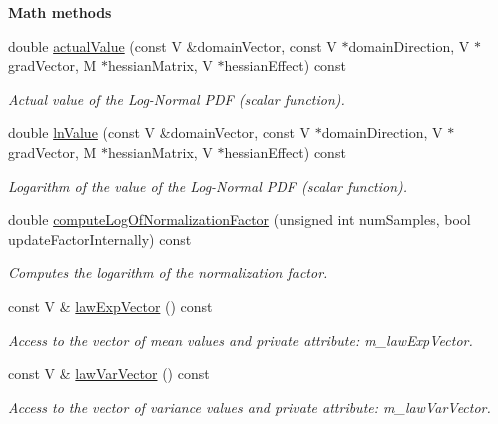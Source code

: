 \begin{Indent}{\bf Math methods}\par
\begin{DoxyCompactItemize}
\item 
double \hyperlink{class_q_u_e_s_o_1_1_log_normal_joint_pdf_a87729cb9d59b73baefcbecb03e753cb9}{actual\-Value} (const V \&domain\-Vector, const V $\ast$domain\-Direction, V $\ast$grad\-Vector, M $\ast$hessian\-Matrix, V $\ast$hessian\-Effect) const 
\begin{DoxyCompactList}\small\item\em Actual value of the Log-\/\-Normal P\-D\-F (scalar function). \end{DoxyCompactList}\item 
double \hyperlink{class_q_u_e_s_o_1_1_log_normal_joint_pdf_a9c31e89ee4abe8f1747e50c8d472a94d}{ln\-Value} (const V \&domain\-Vector, const V $\ast$domain\-Direction, V $\ast$grad\-Vector, M $\ast$hessian\-Matrix, V $\ast$hessian\-Effect) const 
\begin{DoxyCompactList}\small\item\em Logarithm of the value of the Log-\/\-Normal P\-D\-F (scalar function). \end{DoxyCompactList}\item 
double \hyperlink{class_q_u_e_s_o_1_1_log_normal_joint_pdf_a373e37c21ce8acf05fe72f4ec9deef9c}{compute\-Log\-Of\-Normalization\-Factor} (unsigned int num\-Samples, bool update\-Factor\-Internally) const 
\begin{DoxyCompactList}\small\item\em Computes the logarithm of the normalization factor. \end{DoxyCompactList}\item 
const V \& \hyperlink{class_q_u_e_s_o_1_1_log_normal_joint_pdf_a2ca856981ab03d0c84d19715da581c83}{law\-Exp\-Vector} () const 
\begin{DoxyCompactList}\small\item\em Access to the vector of mean values and private attribute\-: m\-\_\-law\-Exp\-Vector. \end{DoxyCompactList}\item 
const V \& \hyperlink{class_q_u_e_s_o_1_1_log_normal_joint_pdf_afa9f7634ae6e54973cfe14463740171e}{law\-Var\-Vector} () const 
\begin{DoxyCompactList}\small\item\em Access to the vector of variance values and private attribute\-: m\-\_\-law\-Var\-Vector. \end{DoxyCompactList}\end{DoxyCompactItemize}
\end{Indent}
